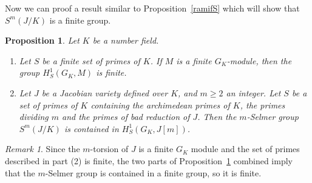 \documentclass[a4paper, 12pt]{amsart}
\theoremstyle{definition}
\theoremstyle{plain}
\newtheorem{prop0}[defn0]{Proposition}
\theoremstyle{plain}
\theoremstyle{plain}
\theoremstyle{plain}
\theoremstyle{remark}
\theoremstyle{remark}
\newtheorem{remark0}[defn0]{Remark}
\theoremstyle{plain}
\newenvironment{proposition}{ \begin{prop0}}{\end{prop0}}
\newenvironment{remark}{ \begin{remark0}\rm}{\end{remark0}}
\newcommand{\propref}[1]{Proposition~\ref{#1}}
\begin{document}
	Now we can proof a result similar to \propref{ramifS} which will show that $S^m(J/K)$ is a finite group.
	\begin{proposition}\label{selfinite}Let $K$ be a number field.
		\begin{enumerate}
			\item Let $S$ be a finite set of primes of $K$. If $M$ is a finite $G_K$-module, then the group $H^1_S(G_K,M)$ is finite.
			\item Let $J$ be a Jacobian variety defined over $K$, and $m\ge 2$ an integer. Let $S$ be a set of primes of $K$ containing the archimedean primes of $K$, the primes dividing $m$ and the primes of bad reduction of $J$. Then the $m$-Selmer group $S^m(J/K)$ is contained in $H^1_S(G_K,J[m])$.
		\end{enumerate}
	\end{proposition}
	\begin{remark}
		Since the $m$-torsion of $J$ is a finite $G_K$ module and the set of primes described in part (2) is finite, the two parts of \propref{selfinite} combined imply that the $m$-Selmer group is contained in a finite group, so it is finite.
	\end{remark}
\end{document}
